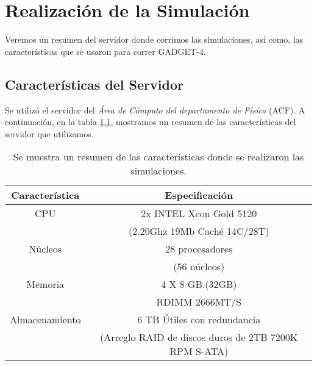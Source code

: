 \appendix
\setcounter{chapter}{0}
\renewcommand{\chaptername}{Apéndice}
\renewcommand{\theequation}{\Alph{chapter}.\arabic{section}.\arabic{equation}}
\setcounter{equation}{0}
\setcounter{figure}{0}
\chapter{Realización de la Simulación} \label{appendix:Ser-Sim-INFO}
Veremos un resumen del servidor donde corrimos las simulaciones, así como, las características que se usaron para correr GADGET-4.

\section{Características del Servidor}
Se utilizó el servidor del \emph{Área de Cómputo del departamento de Física} (ACF). A continuación, en la tabla \ref{tab:Carac-Server}, mostramos un resumen de las características del servidor que utilizamos. 

\begin{table}[H]
    
    \centering
	
    \begin{tabular}{|c|c|}

        \hline
        \textbf{Característica} & \textbf{Especificación} \\ \hline
        CPU & 2x INTEL Xeon Gold 5120 \\ 
         & (2.20Ghz 19Mb Caché 14C/28T) \\ \hline
        Núcleos & 28 procesadores \\ 
         & (56 núcleos) \\ \hline
        Memoria & 4 X 8 GB.(32GB) \\
         & RDIMM 2666MT/S \\ \hline
        Almacenamiento & 6 TB Útiles con redundancia \\
         & (Arreglo RAID de discos duros de 2TB 7200K RPM S-ATA) \\ \hline

    \end{tabular}
	
    \caption{Se muestra un resumen de las características donde se realizaron las simulaciones.}

    \label{tab:Carac-Server}

\end{table}

